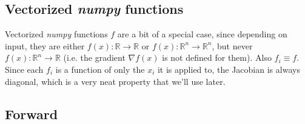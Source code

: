 \documentclass[paper=a4,11pt,headsepline]{scrartcl}
\newcommand{\ve}[1]{\ensuremath{\bm{\mathit{#1}}}}
\newcommand{\ra}{\ensuremath{\rightarrow}}
\newcommand{\soft}[1]{\textsl{#1}\xspace}
\newcommand{\numpy}{\soft{numpy}}
\begin{document}
\subsection{Vectorized \numpy functions}

Vectorized \numpy functions $f$ are a bit of a special case, since depending on
input, they are either $f(x):\mathbb R\ra\mathbb R$ or $\ve f(\ve x):\mathbb
R^n\ra\mathbb R^n$, but never $f(\ve x): \mathbb R^n \ra \mathbb R$ (i.e. the
gradient $\nabla f(\ve x)$ is not defined for them). Also $f_i\equiv f$. Since
each $f_i$ is a function of only the $x_i$ it is applied to, the Jacobian is
always diagonal, which is a very neat property that we'll use later.

\subsection{Forward}
\end{document}
